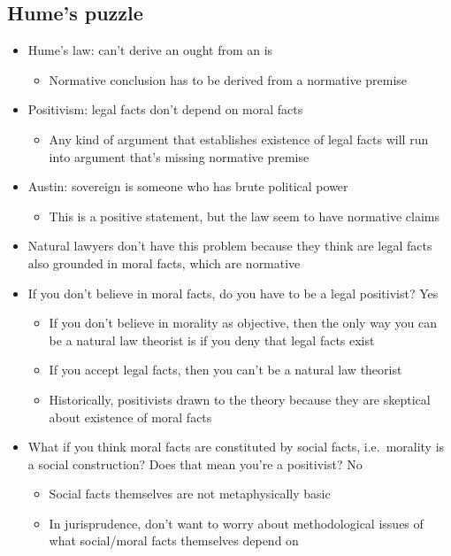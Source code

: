 \hypertarget{humes-puzzle}{%
\subsection{Hume's puzzle}\label{humes-puzzle}}

\begin{itemize}
\tightlist
\item
  Hume's law: can't derive an ought from an is

  \begin{itemize}
  \tightlist
  \item
    Normative conclusion has to be derived from a normative premise
  \end{itemize}
\item
  Positivism: legal facts don't depend on moral facts

  \begin{itemize}
  \tightlist
  \item
    Any kind of argument that establishes existence of legal facts will
    run into argument that's missing normative premise
  \end{itemize}
\item
  Austin: sovereign is someone who has brute political power

  \begin{itemize}
  \tightlist
  \item
    This is a positive statement, but the law seem to have normative
    claims
  \end{itemize}
\item
  Natural lawyers don't have this problem because they think are legal
  facts also grounded in moral facts, which are normative
\item
  If you don't believe in moral facts, do you have to be a legal
  positivist? Yes

  \begin{itemize}
  \tightlist
  \item
    If you don't believe in morality as objective, then the only way you
    can be a natural law theorist is if you deny that legal facts exist
  \item
    If you accept legal facts, then you can't be a natural law theorist
  \item
    Historically, positivists drawn to the theory because they are
    skeptical about existence of moral facts
  \end{itemize}
\item
  What if you think moral facts are constituted by social facts,
  i.e.~morality is a social construction? Does that mean you're a
  positivist? No

  \begin{itemize}
  \tightlist
  \item
    Social facts themselves are not metaphysically basic
  \item
    In jurisprudence, don't want to worry about methodological issues of
    what social/moral facts themselves depend on
  \end{itemize}
\end{itemize}

